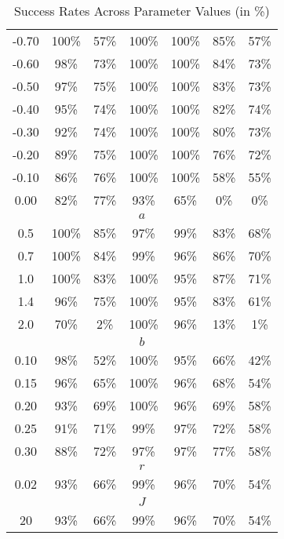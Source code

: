 \begin{table}[h!]
\begin{tabular}{c|cccccc}
    -0.70 & 100\% & 57\% & 100\% & 100\% & 85\% & 57\% \\
    -0.60 & 98\% & 73\% & 100\% & 100\% & 84\% & 73\% \\
    -0.50 & 97\% & 75\% & 100\% & 100\% & 83\% & 73\% \\
    -0.40 & 95\% & 74\% & 100\% & 100\% & 82\% & 74\% \\
    -0.30 & 92\% & 74\% & 100\% & 100\% & 80\% & 73\% \\
    -0.20 & 89\% & 75\% & 100\% & 100\% & 76\% & 72\% \\
    -0.10 & 86\% & 76\% & 100\% & 100\% & 58\% & 55\% \\
    0.00  & 82\% & 77\% & 93\% & 65\% & 0\%  & 0\% \\
    \midrule
    \multicolumn{7}{c}{$a$} \\
    0.5 & 100\% & 85\% & 97\% & 99\% & 83\% & 68\% \\
    0.7 & 100\% & 84\% & 99\% & 96\% & 86\% & 70\% \\
    1.0 & 100\% & 83\% & 100\% & 95\% & 87\% & 71\% \\
    1.4 & 96\%  & 75\% & 100\% & 95\% & 83\% & 61\% \\
    2.0 & 70\%  & 2\%  & 100\% & 96\% & 13\% & 1\% \\
    \midrule
    \multicolumn{7}{c}{$b$} \\
    0.10 & 98\% & 52\% & 100\% & 95\% & 66\% & 42\% \\
    0.15 & 96\% & 65\% & 100\% & 96\% & 68\% & 54\% \\
    0.20 & 93\% & 69\% & 100\% & 96\% & 69\% & 58\% \\
    0.25 & 91\% & 71\% & 99\%  & 97\% & 72\% & 58\% \\
    0.30 & 88\% & 72\% & 97\%  & 97\% & 77\% & 58\% \\
    \midrule
    \multicolumn{7}{c}{$r$} \\
    0.02 & 93\% & 66\% & 99\% & 96\% & 70\% & 54\% \\
    \midrule
    \multicolumn{7}{c}{$J$} \\
    20 & 93\% & 66\% & 99\% & 96\% & 70\% & 54\% \\
    \bottomrule
    \end{tabular}
    \caption{Success Rates Across Parameter Values (in \%)}
\end{table}
